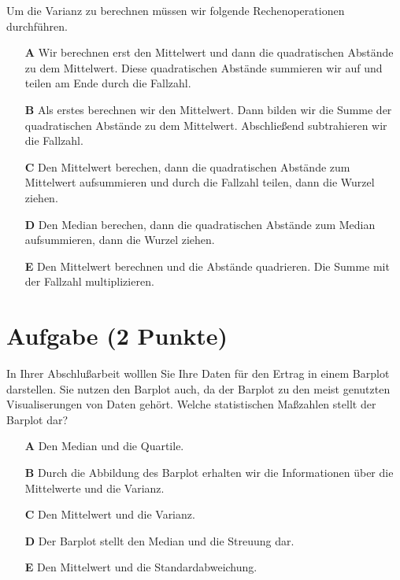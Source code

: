 \documentclass[a4paper, 9pt]{scrartcl}\usepackage[]{graphicx}\usepackage[]{xcolor}
\begin{document}
Um die Varianz zu berechnen müssen wir folgende Rechenoperationen durchführen.



\begin{enumerate}
\item [\textbf{A} \msquare] Wir berechnen erst den Mittelwert und dann die quadratischen Abstände zu dem Mittelwert. Diese quadratischen Abstände summieren wir auf und teilen am Ende durch die Fallzahl.
\item [\textbf{B} \msquare] Als erstes berechnen wir den Mittelwert. Dann bilden wir die Summe der quadratischen Abstände zu dem Mittelwert. Abschließend subtrahieren wir die Fallzahl.
\item [\textbf{C} \msquare] Den Mittelwert berechen, dann die quadratischen Abstände zum Mittelwert aufsummieren und durch die Fallzahl teilen, dann die Wurzel ziehen.
\item [\textbf{D} \msquare] Den Median berechen, dann die quadratischen Abstände zum Median aufsummieren, dann die Wurzel ziehen.
\item [\textbf{E} \msquare] Den Mittelwert berechnen und die Abstände quadrieren. Die Summe mit der Fallzahl multiplizieren.
\end{enumerate} 

\section{Aufgabe \hfill (2 Punkte)}



In Ihrer Abschlußarbeit wolllen Sie Ihre Daten für den Ertrag in einem Barplot darstellen. Sie nutzen den Barplot auch, da der Barplot zu den meist genutzten Visualiserungen von Daten gehört. Welche statistischen Maßzahlen stellt der Barplot dar?

 



\begin{enumerate}
\item [\textbf{A} \msquare] Den Median und die Quartile.
\item [\textbf{B} \msquare] Durch die Abbildung des Barplot erhalten wir die Informationen über die Mittelwerte und die Varianz.
\item [\textbf{C} \msquare] Den Mittelwert und die Varianz.
\item [\textbf{D} \msquare] Der Barplot stellt den Median und die Streuung dar.
\item [\textbf{E} \msquare] Den Mittelwert und die Standardabweichung.
\end{enumerate}
\end{document}
